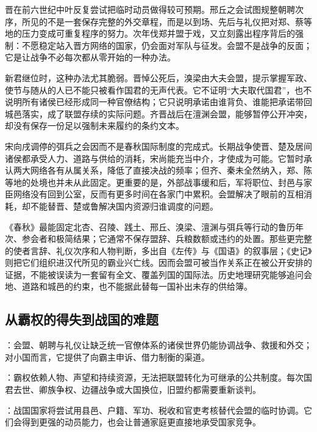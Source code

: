 晋在前六世纪中叶反复尝试把临时动员做得较可预期。邢丘之会试图规整朝聘次序，所见的不是一套保存完整的外交章程，而是以到场、先后与礼仪把对郑、蔡等地的压力变成可重复程序的努力。次年伐郑并盟于戏，又立刻露出程序背后的强制：不愿稳定站入晋方网络的国家，仍会面对军队与征发。会盟不是战争的反面；它是让战争不必每次都从零开始的一种办法。

新君继位时，这种办法尤其脆弱。晋悼公死后，溴梁由大夫会盟，提示掌握军政、使节与随从的人已不能只被看作国君的无声代表。它不证明“大夫取代国君”，也不说明所有诸侯已经形成同一种官僚结构；它只说明承诺由谁背负、谁能把承诺带回城邑落实，成了联盟存续的实际问题。齐晋战后在澶渊会盟，能够暂停公开冲突，却没有保存一份足以强制未来履约的条约文本。

宋向戌调停的弭兵之会因而不是春秋国际制度的完成式。长期战争使晋、楚及居间诸侯都承受人力、道路与供给的消耗，宋尚能充当中介，才使成为可能。它暂时承认两大网络各有从属关系，降低了直接决战的频率；但齐、秦未全然纳入，郑、陈等地的处境也并未从此固定。更重要的是，外部战事缓和后，军将职位、封邑与家臣网络没有回到公室，反而有更多时间在各家门中累积。会盟解决了眼前的互相消耗，却不能替晋、楚或鲁解决国内资源归谁调度的问题。

\begin{sourcenote}
《春秋》最能固定北杏、召陵、践土、邢丘、溴梁、澶渊与弭兵等行动的鲁历年次、参会者和极简结果；它通常不保存盟辞、兵粮数额或违约的处置。那些更完整的使者言辞、礼仪次序和人物判断，多出自《左传》与《国语》的叙事层；《史记》则把它们组织进汉代所见的霸业兴亡线。因而会盟可被当作关系正在被公开安排的证据，不能被误读为一套留有全文、覆盖列国的国际法。历史地理研究能够追问会地、道路和城邑的约束，也不能据此替每一国补出未存的供给簿。
\end{sourcenote}

\subsection{从霸权的得失到战国的难题}

\begin{turningpoint}
：会盟、朝聘与礼仪让缺乏统一官僚体系的诸侯世界仍能协调战争、救援和外交；对小国而言，它提供了向霸主申诉、借力制衡的渠道。

：霸权依赖人物、声望和持续资源，无法把联盟转化为可继承的公共制度。每次国君去世、卿族争权、边疆战争或大国换位，旧盟约都需要重新谈判。

：战国国家将尝试用县邑、户籍、军功、税收和官吏考核替代会盟的临时协调。它们会得到更强的动员能力，也会让普通家庭更直接地承受国家竞争。
\end{turningpoint}

